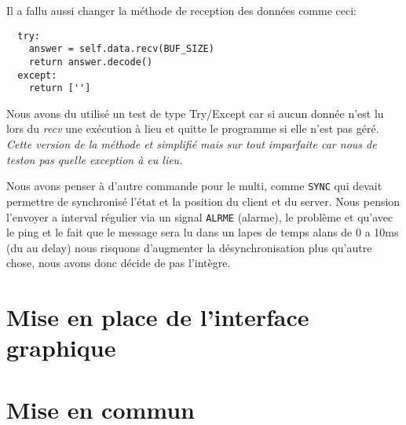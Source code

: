 \documentclass[12pt]{report}
\begin{document}
Il a fallu aussi changer la méthode de reception des données comme ceci:
\begin{verbatim}
  try:
    answer = self.data.recv(BUF_SIZE)
    return answer.decode()
  except:
    return ['']
\end{verbatim}

Nous avons du utilisé un test de type Try/Except car si aucun donnée n'est lu
lors du \textit{recv} une exécution à lieu et quitte le programme si elle
n'est pas géré.
\textit{Cette version de la méthode et simplifié mais sur tout imparfaite
  car nous de teston pas quelle exception à eu lieu.}

Nous avons penser à d'autre commande pour le multi, comme \texttt{SYNC} qui
devait permettre de synchronisé l'état et la position du client et du server.
Nous pension l'envoyer a interval régulier via un signal \texttt{ALRME} (alarme),
le problème et qu'avec le ping et le fait que le message sera lu dans un lapes
de temps alans de 0 a 10ms (du au delay) nous risquons d'augmenter la
désynchronisation plus qu'autre chose, nous avons donc décide de pas l'intègre.

\chapter{Mise en place de l'interface graphique}

\chapter{Mise en commun}
\end{document}
